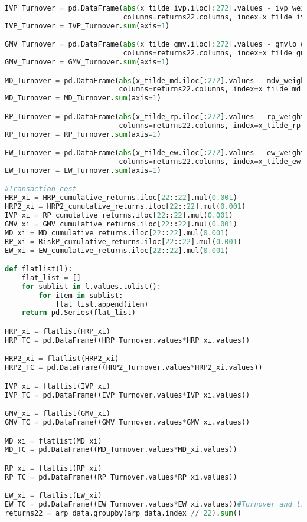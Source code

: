 \begin{lstlisting}[language=Python]
IVP_Turnover = pd.DataFrame(abs(x_tilde_ivp.iloc[:272].values - ivp_weights.iloc[1:].values),
                            columns=returns22.columns, index=x_tilde_ivp.iloc[:272].index)
IVP_Turnover = IVP_Turnover.sum(axis=1)

GMV_Turnover = pd.DataFrame(abs(x_tilde_gmv.iloc[:272].values - gmvlo_weights.iloc[1:].values),
                            columns=returns22.columns, index=x_tilde_gmv.iloc[:272].index)
GMV_Turnover = GMV_Turnover.sum(axis=1)

MD_Turnover = pd.DataFrame(abs(x_tilde_md.iloc[:272].values - mdv_weights.iloc[1:].values),
                           columns=returns22.columns, index=x_tilde_md.iloc[:272].index)
MD_Turnover = MD_Turnover.sum(axis=1)

RP_Turnover = pd.DataFrame(abs(x_tilde_rp.iloc[:272].values - rp_weights.iloc[1:].values),
                           columns=returns22.columns, index=x_tilde_rp.iloc[:272].index)
RP_Turnover = RP_Turnover.sum(axis=1)

EW_Turnover = pd.DataFrame(abs(x_tilde_ew.iloc[:272].values - ew_weights.iloc[1:].values),
                           columns=returns22.columns, index=x_tilde_ew.iloc[:272].index)
EW_Turnover = EW_Turnover.sum(axis=1)

#Transaction cost
HRP_xi = HRP_cumulative_returns.iloc[22::22].mul(0.001)
HRP2_xi = HRP2_cumulative_returns.iloc[22::22].mul(0.001)
IVP_xi = RP_cumulative_returns.iloc[22::22].mul(0.001)
GMV_xi = GMV_cumulative_returns.iloc[22::22].mul(0.001)
MD_xi = MD_cumulative_returns.iloc[22::22].mul(0.001)
RP_xi = RiskP_cumulative_returns.iloc[22::22].mul(0.001)
EW_xi = EW_cumulative_returns.iloc[22::22].mul(0.001)

def flatlist(l):
    flat_list = []
    for sublist in l.values.tolist():
        for item in sublist:
            flat_list.append(item)
    return pd.Series(flat_list)

HRP_xi = flatlist(HRP_xi)
HRP_TC = pd.DataFrame((HRP_Turnover.values*HRP_xi.values))

HRP2_xi = flatlist(HRP2_xi)
HRP2_TC = pd.DataFrame((HRP2_Turnover.values*HRP2_xi.values))

IVP_xi = flatlist(IVP_xi)
IVP_TC = pd.DataFrame((IVP_Turnover.values*IVP_xi.values))

GMV_xi = flatlist(GMV_xi)
GMV_TC = pd.DataFrame((GMV_Turnover.values*GMV_xi.values))

MD_xi = flatlist(MD_xi)
MD_TC = pd.DataFrame((MD_Turnover.values*MD_xi.values))

RP_xi = flatlist(RP_xi)
RP_TC = pd.DataFrame((RP_Turnover.values*RP_xi.values))

EW_xi = flatlist(EW_xi)
EW_TC = pd.DataFrame((EW_Turnover.values*EW_xi.values))#Turnover and transaction costs
returns22 = arp_data.groupby(arp_data.index // 22).sum()
\end{lstlisting}

